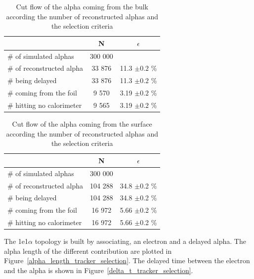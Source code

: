\documentclass[main.tex]{subfiles}
\begin{document}
\begin{table}[h!]
\begin{center}
\begin{tabular}{l|c|c}
 & N & $\epsilon$ \\
\toprule
$\#$ of simulated alphas & 300 000 & \\
\hline
$\#$ of reconstructed alpha & 33 876 & 11.3 $ \pm 0.2$ \%\\
$\#$ being delayed          & 33 876 & 11.3 $ \pm 0.2$ \%\\
$\#$ coming from the foil   & 9 570  & 3.19 $ \pm 0.2$ \%\\
$\#$ hitting no calorimeter & 9 565  & 3.19 $ \pm 0.2$ \%\\
\bottomrule
\end{tabular}
\end{center}
\caption{Cut flow of the alpha coming from the bulk according the number of reconstructed alphas and the selection criteria}
\label{Cutflowalphatrackerbulk}
\end{table}


\begin{table}[h!]
\begin{center}
\begin{tabular}{l|c|c}
 & N & $\epsilon$ \\
\toprule
$\#$ of simulated alphas & 300 000 & \\
\hline
$\#$ of reconstructed alpha & 104 288 & 34.8 $ \pm $0.2 \%\\
$\#$ being delayed          & 104 288 & 34.8 $ \pm $0.2 \%\\
$\#$ coming from the foil   & 16 972  & 5.66 $ \pm $0.2 \%\\
$\#$ hitting no calorimeter & 16 972  & 5.66 $ \pm $0.2 \%\\
\bottomrule
\end{tabular}
\end{center}
\caption{Cut flow of the alpha coming from the surface according the number of reconstructed alphas and the selection criteria}
\label{Cutflowalphatrackersurface}
\end{table}


\bigskip


\noindent The 1e1$\alpha$ topology is built by associating, an electron and a delayed alpha. The alpha length of the different contribution are plotted in Figure~\ref{alpha_length_tracker_selection}. The delayed time between the electron and the alpha is shown in Figure~\ref{delta_t_tracker_selection}.
\end{document}
